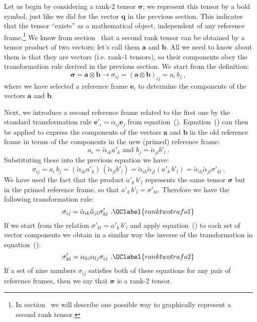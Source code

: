 Let us begin by considering a rank-2 tensor $\bm{\sigma}$; we represent this tensor by a bold symbol, just like we did for the vector $\mathbf{q}$ in the previous section. This indicates that the tensor ``exists'' as a mathematical object, independent of any reference frame.\footnote{In section~ we will describe one possible way to graphically represent a second rank tensor.}  We know from section~ that a second rank tensor can be obtained by a tensor product of two vectors; let's call them $\mathbf{a}$ and $\mathbf{b}$.  All we need to know about them is that they are vectors (i.e. rank-1 tensors), so their components obey the transformation rule derived in the previous section.  We start from the definition:
\begin{equation}
	\bm{\sigma} = \mathbf{a}\otimes\mathbf{b}\rightarrow \sigma_{ij} = (\mathbf{a}\otimes\mathbf{b})_{ij} = a_i\,b_j\ ,
\end{equation}
where we have selected a reference frame $\mathbf{e}_i$ to determine the components of the vectors $\mathbf{a}$ and $\mathbf{b}$.  

Next, we introduce a second reference frame related to the first one by the standard transformation rule $\mathbf{e}'_i = \alpha_{ij}\mathbf{e}_j$ from equation~().  Equation~() can then be applied to express the components of the vectors $\mathbf{a}$ and $\mathbf{b}$ in the old reference frame in terms of the components in the new (primed) reference frame:
\[
	a_i = \tilde{\alpha}_{ik}a'_k\text{ and }b_j=\tilde{\alpha}_{jl}b'_l\ .
\]
Substituting these into the previous equation we have:
\[
	\sigma_{ij} = a_i\,b_j = (\tilde{\alpha}_{ik}a'_k)\,(\tilde{\alpha}_{jl}b'_l) = \tilde{\alpha}_{ik}\tilde{\alpha}_{jl} (a'_k\,b'_l) = \tilde{\alpha}_{ik}\tilde{\alpha}_{jl} \sigma'_{kl}\ .
\]
We have used the fact that the product $a'_k\,b'_l$ represents the same tensor $\bm{\sigma}$ but in the primed reference frame, so that $a'_k\,b'_l=\sigma'_{kl}$.  Therefore we have the following transformation rule:
\begin{equation}
	\sigma_{ij} = \tilde{\alpha}_{ik}\tilde{\alpha}_{jl} \sigma'_{kl}\ .\OClabel{ranktwotrafo1}
\end{equation}
If we start from the relation $\sigma'_{kl}=a'_k\,b'_l$ and apply equation~() to each set of vector components we obtain in a similar way the inverse of the transformation in equation~():
\begin{equation}
	\sigma'_{kl} = \alpha_{ki}\alpha_{lj} \sigma_{ij}\ .\OClabel{ranktwotrafo2}
\end{equation}
If a set of nine numbers $\sigma_{ij}$ satisfies both of these equations for any pair of reference frames, then we say that $\bm{\sigma}$ is a rank-2 tensor.

